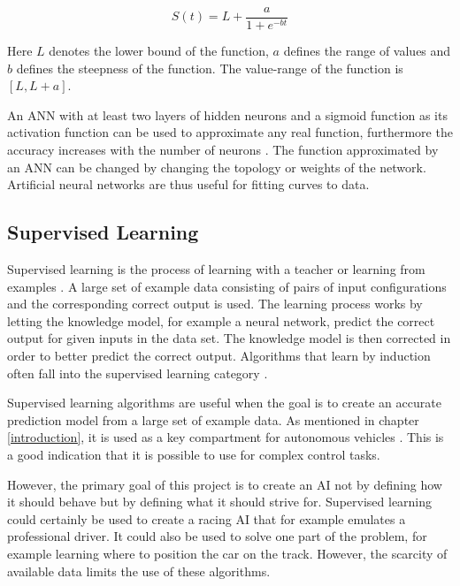 \begin{equation}
    S(t) = L + \frac{a}{1 + e^{-bt}}
\end{equation}

\noindent
Here $L$ denotes the lower bound of the function, $a$ defines the range of values and $b$ defines the steepness of the function. The value-range of the function is $[L, L+a]$. 

An ANN with at least two layers of hidden neurons and a sigmoid function as its activation function can be used to approximate any real function, furthermore the accuracy increases with the number of neurons \cite{mitchel:approximation}. The function approximated by an ANN can be changed by changing the topology or weights of the network. Artificial neural networks are thus useful for fitting curves to data. 



\subsection{Supervised Learning}
Supervised learning is the process of learning with a teacher or learning from examples \cite{haykin:supervised}. A large set of example data consisting of pairs of input configurations and the corresponding correct output is used. The learning process works by letting the knowledge model, for example a neural network, predict the correct output for given inputs in the data set. The knowledge model is then corrected in order to better predict the correct output. Algorithms that learn by induction often fall into the supervised learning category \cite{glossary}. 

Supervised learning algorithms are useful when the goal is to create an accurate prediction model from a large set of example data. As mentioned in chapter \ref{introduction}, it is used as a key compartment for autonomous vehicles \cite{?}. This is a good indication that it is possible to use for complex control tasks.

However, the primary goal of this project is to create an AI not by defining how it should behave but by defining what it should strive for. Supervised learning could certainly be used to create a racing AI that for example emulates a professional driver. It could also be used to solve one part of the problem, for example learning where to position the car on the track. However, the scarcity of available data limits the use of these algorithms.  



